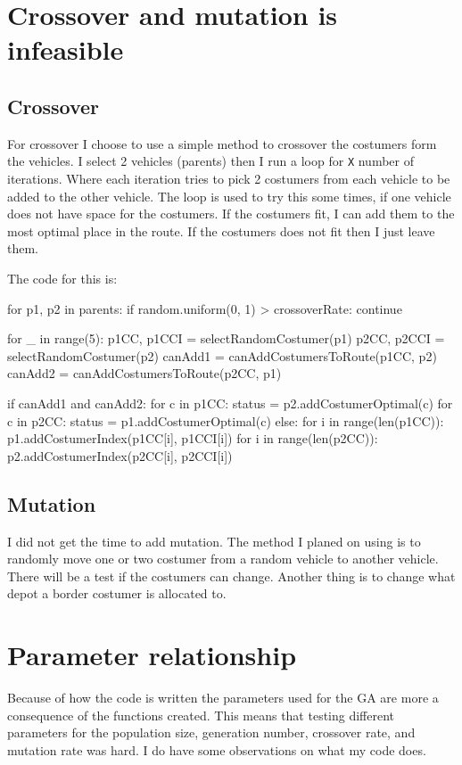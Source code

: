 \documentclass[10pt]{article}
\begin{document}
    \section{Crossover and mutation is infeasible}
    \subsection{Crossover}
    For crossover I choose to use a simple method to crossover the costumers form the vehicles. I select 2 vehicles (parents) then I run a loop for \texttt{X} number of iterations. Where each iteration tries to pick 2 costumers from each vehicle to be added to the other vehicle. The loop is used to try this some times, if one vehicle does not have space for the costumers. If the costumers fit, I can add them to the most optimal place in the route. If the costumers does not fit then I just leave them.
    
    The code for this is:
    \begin{pythoncode}
    for p1, p2 in parents:
        if random.uniform(0, 1) > crossoverRate:
            continue

        for _ in range(5):
            p1CC, p1CCI = selectRandomCostumer(p1)
            p2CC, p2CCI = selectRandomCostumer(p2)
            canAdd1 = canAddCostumersToRoute(p1CC, p2)
            canAdd2 = canAddCostumersToRoute(p2CC, p1)

            if canAdd1 and canAdd2:
                for c in p1CC:
                    status = p2.addCostumerOptimal(c)                
                for c in p2CC:
                    status = p1.addCostumerOptimal(c)
            else:
                for i in range(len(p1CC)):
                    p1.addCostumerIndex(p1CC[i], p1CCI[i])
                for i in range(len(p2CC)):
                    p2.addCostumerIndex(p2CC[i], p2CCI[i])
    \end{pythoncode}

    \subsection{Mutation}
    I did not get the time to add mutation. The method I planed on using is to randomly move one or two costumer from a random vehicle to another vehicle. There will be a test if the costumers can change. Another thing is to change what depot a border costumer is allocated to.

    \section{Parameter relationship}
    Because of how the code is written the parameters used for the GA are more a consequence of the functions created. This means that testing different parameters for the population size, generation number, crossover rate, and mutation rate was hard. I do have some observations on what my code does.
    
\end{document}
